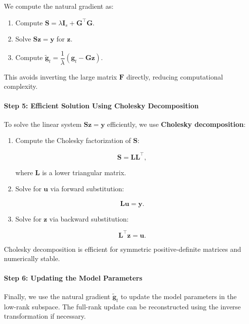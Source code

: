 We compute the natural gradient as:

\begin{enumerate}
    \item Compute $\mathbf{S} = \lambda \mathbf{I}_s + \mathbf{G}^\top \mathbf{G}$.
    \item Solve $\mathbf{S} \mathbf{z} = \mathbf{y}$ for $\mathbf{z}$.
    \item Compute $\tilde{\mathbf{g}}_t = \dfrac{1}{\lambda} \left( \mathbf{g}_t - \mathbf{G} \mathbf{z} \right)$.
\end{enumerate}

This avoids inverting the large matrix $\mathbf{F}$ directly, reducing computational complexity.

\paragraph{Step 5: Efficient Solution Using Cholesky Decomposition}

To solve the linear system $\mathbf{S} \mathbf{z} = \mathbf{y}$ efficiently, we use \textbf{Cholesky decomposition}:

\begin{enumerate}
    \item Compute the Cholesky factorization of $\mathbf{S}$:

    \[
    \mathbf{S} = \mathbf{L} \mathbf{L}^\top,
    \]

    where $\mathbf{L}$ is a lower triangular matrix.

    \item Solve for $\mathbf{u}$ via forward substitution:

    \[
    \mathbf{L} \mathbf{u} = \mathbf{y}.
    \]

    \item Solve for $\mathbf{z}$ via backward substitution:

    \[
    \mathbf{L}^\top \mathbf{z} = \mathbf{u}.
    \]
\end{enumerate}

Cholesky decomposition is efficient for symmetric positive-definite matrices and numerically stable.

\paragraph{Step 6: Updating the Model Parameters}



Finally, we use the natural gradient $\tilde{\mathbf{g}}_t$ to update the model parameters in the low-rank subspace. The full-rank update can be reconstructed using the inverse transformation if necessary.

